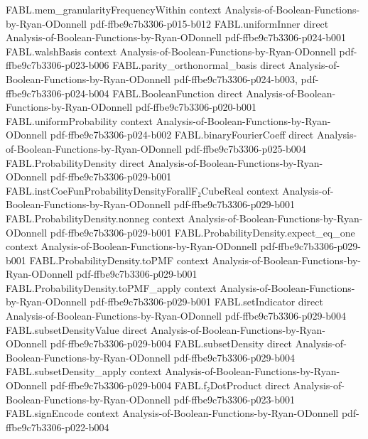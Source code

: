 \begin{theorem}
\proofstep
  {FABL.mem_granularityFrequencyWithin}
  {context}
  {Analysis-of-Boolean-Functions-by-Ryan-ODonnell}
  {pdf-ffbe9c7b3306-p015-b012}
\proofstep
  {FABL.uniformInner}
  {direct}
  {Analysis-of-Boolean-Functions-by-Ryan-ODonnell}
  {pdf-ffbe9c7b3306-p024-b001}
\proofstep
  {FABL.walshBasis}
  {context}
  {Analysis-of-Boolean-Functions-by-Ryan-ODonnell}
  {pdf-ffbe9c7b3306-p023-b006}
\proofstep
  {FABL.parity_orthonormal_basis}
  {direct}
  {Analysis-of-Boolean-Functions-by-Ryan-ODonnell}
  {pdf-ffbe9c7b3306-p024-b003,
    pdf-ffbe9c7b3306-p024-b004}
\proofstep
  {FABL.BooleanFunction}
  {direct}
  {Analysis-of-Boolean-Functions-by-Ryan-ODonnell}
  {pdf-ffbe9c7b3306-p020-b001}
\proofstep
  {FABL.uniformProbability}
  {context}
  {Analysis-of-Boolean-Functions-by-Ryan-ODonnell}
  {pdf-ffbe9c7b3306-p024-b002}
\proofstep
  {FABL.binaryFourierCoeff}
  {direct}
  {Analysis-of-Boolean-Functions-by-Ryan-ODonnell}
  {pdf-ffbe9c7b3306-p025-b004}
\proofstep
  {FABL.ProbabilityDensity}
  {direct}
  {Analysis-of-Boolean-Functions-by-Ryan-ODonnell}
  {pdf-ffbe9c7b3306-p029-b001}
\proofstep
  {FABL.instCoeFunProbabilityDensityForallF₂CubeReal}
  {context}
  {Analysis-of-Boolean-Functions-by-Ryan-ODonnell}
  {pdf-ffbe9c7b3306-p029-b001}
\proofstep
  {FABL.ProbabilityDensity.nonneg}
  {context}
  {Analysis-of-Boolean-Functions-by-Ryan-ODonnell}
  {pdf-ffbe9c7b3306-p029-b001}
\proofstep
  {FABL.ProbabilityDensity.expect_eq_one}
  {context}
  {Analysis-of-Boolean-Functions-by-Ryan-ODonnell}
  {pdf-ffbe9c7b3306-p029-b001}
\proofstep
  {FABL.ProbabilityDensity.toPMF}
  {context}
  {Analysis-of-Boolean-Functions-by-Ryan-ODonnell}
  {pdf-ffbe9c7b3306-p029-b001}
\proofstep
  {FABL.ProbabilityDensity.toPMF_apply}
  {context}
  {Analysis-of-Boolean-Functions-by-Ryan-ODonnell}
  {pdf-ffbe9c7b3306-p029-b001}
\proofstep
  {FABL.setIndicator}
  {direct}
  {Analysis-of-Boolean-Functions-by-Ryan-ODonnell}
  {pdf-ffbe9c7b3306-p029-b004}
\proofstep
  {FABL.subsetDensityValue}
  {direct}
  {Analysis-of-Boolean-Functions-by-Ryan-ODonnell}
  {pdf-ffbe9c7b3306-p029-b004}
\proofstep
  {FABL.subsetDensity}
  {direct}
  {Analysis-of-Boolean-Functions-by-Ryan-ODonnell}
  {pdf-ffbe9c7b3306-p029-b004}
\proofstep
  {FABL.subsetDensity_apply}
  {context}
  {Analysis-of-Boolean-Functions-by-Ryan-ODonnell}
  {pdf-ffbe9c7b3306-p029-b004}
\proofstep
  {FABL.f₂DotProduct}
  {direct}
  {Analysis-of-Boolean-Functions-by-Ryan-ODonnell}
  {pdf-ffbe9c7b3306-p023-b001}
\proofstep
  {FABL.signEncode}
  {context}
  {Analysis-of-Boolean-Functions-by-Ryan-ODonnell}
  {pdf-ffbe9c7b3306-p022-b004}
\proofstep

\end{theorem}
